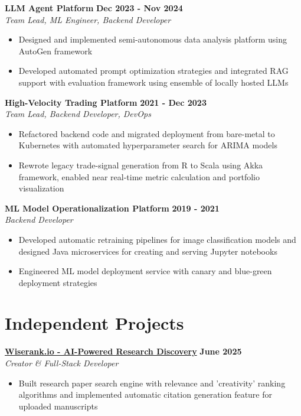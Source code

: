 \documentclass[11pt]{article}
\begin{document}
\textbf{LLM Agent Platform} \hfill \textbf{Dec 2023 - Nov 2024} \\
\textit{Team Lead, ML Engineer, Backend Developer}
\begin{itemize}[leftmargin=*, nosep]
\item Designed and implemented semi-autonomous data analysis platform using AutoGen framework
\item Developed automated prompt optimization strategies and integrated RAG support with evaluation framework using ensemble of locally hosted LLMs
\end{itemize}

\textbf{High-Velocity Trading Platform} \hfill \textbf{2021 - Dec 2023} \\
\textit{Team Lead, Backend Developer, DevOps}
\begin{itemize}[leftmargin=*, nosep]
\item Refactored backend code and migrated deployment from bare-metal to Kubernetes with automated hyperparameter search for ARIMA models
\item Rewrote legacy trade-signal generation from R to Scala using Akka framework, enabled near real-time metric calculation and portfolio visualization
\end{itemize}

\textbf{ML Model Operationalization Platform} \hfill \textbf{2019 - 2021} \\
\textit{Backend Developer}
\begin{itemize}[leftmargin=*, nosep]
\item Developed automatic retraining pipelines for image classification models and designed Java microservices for creating and serving Jupyter notebooks
\item Engineered ML model deployment service with canary and blue-green deployment strategies
\end{itemize}

\section{Independent Projects}

\textbf{\href{https://wiserank.io}{Wiserank.io - AI-Powered Research Discovery}} \hfill \textbf{June 2025} \\
\textit{Creator \& Full-Stack Developer}
\begin{itemize}[leftmargin=*, nosep]
\item Built research paper search engine with relevance and 'creativity' ranking algorithms and implemented automatic citation generation feature for uploaded manuscripts
\end{itemize}
\end{document}
